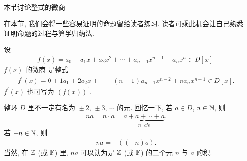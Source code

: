 \subsection*{\Derivatives}
\markright{\Derivatives}

本节讨论整式的微商.

在本节, 我们会将一些容易证明的命题留给读者练习. 读者可乘此机会让自己熟悉证明命题的过程与算学归纳法.

\begin{definition}
    设
    \begin{align*}
        f(x) = a_0 + a_1 x + a_2 x^2 + \cdots + a_{n-1} x^{n-1} + a_n x^n \in D[x].
    \end{align*}
    $f(x)$ 的微商  是整式
    \begin{align*}
        f^{\prime}(x) = 0 + 1a_1 + 2a_2 x + \cdots + (n-1)a_{n-1} x^{n-2} + na_n x^{n-1} \in D[x].
    \end{align*}
    $f^{\prime} (x)$ 也可写为 $(f(x))^{\prime}$.
\end{definition}

\begin{remark}
    整环 $D$ 里不一定有名为 ${} \pm 2$, ${}\pm 3$, $\cdots$ 的元. 回忆一下, 若 $a \in D$, $n \in \mathbb{N}$, 则
    \begin{align*}
        na = n \cdot a = \underbrace{a + a + \cdots + a}_{\text{$n$ $a$'s}}.
    \end{align*}
    若 $-n \in \mathbb{N}$, 则
    \begin{align*}
        na = -((-n)a).
    \end{align*}
    当然, 在 $\mathbb{Z}$ (或 $\mathbb{F}$) 里, $na$ 可以认为是 $\mathbb{Z}$ (或 $\mathbb{F}$) 的二个元 $n$ 与 $a$ 的积.
\end{remark}

